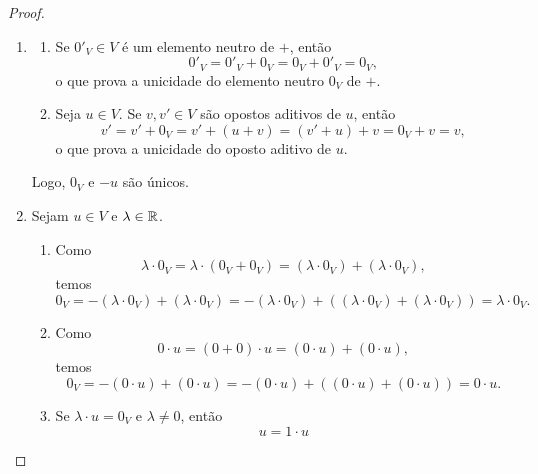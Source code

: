 \begin{proof}
    \leavevmode
        \begin{enumerate}[leftmargin=*, align=left, label=\textbf{(\alph*)}]
            \item
                \begin{enumerate}[label=\roman*.]
                    \item Se $0'_V \in V$ é um elemento neutro de $+$, então
                        \[
                            0'_V = 0'_V + 0_V = 0_V + 0'_V = 0_V,
                        \]
                    o que prova a unicidade do elemento neutro $0_V$ de $+$.
                    \item Seja $u \in V$. Se $v, v' \in V$ são opostos aditivos de $u$, então
                        \[
                            v' = v' + 0_V = v' + (u+v) = (v' + u) + v = 0_V + v = v,
                        \]
                    o que prova a unicidade do oposto aditivo de $u$.
                \end{enumerate}
            Logo, $0_V$ e $-u$ são únicos. \blackproof
            \item Sejam $u \in V$ e $\lambda \in \mathbb{R}$.
                \begin{enumerate}[label=\roman*.]
                    \item Como
                        \[
                            \lambda \cdot 0_V = \lambda \cdot (0_V+0_V)
                            = (\lambda \cdot 0_V) + (\lambda \cdot 0_V),
                        \]
                    temos
                        \[
                            0_V
                            = -(\lambda \cdot 0_V) + (\lambda \cdot 0_V)
                            = -(\lambda \cdot 0_V) + ((\lambda \cdot 0_V) + (\lambda \cdot 0_V))
                            = \lambda \cdot 0_V.
                        \]
                    \item Como
                        \[
                            0 \cdot u = (0+0) \cdot u
                            = (0 \cdot u) + (0 \cdot u),
                        \]
                    temos
                        \[
                            0_V
                            = -(0 \cdot u) + (0 \cdot u)
                            = -(0 \cdot u) + ((0 \cdot u) + (0 \cdot u))
                            = 0 \cdot u.
                        \]
                    \item Se $\lambda \cdot u = 0_V$ e $\lambda \neq 0$, então
                        \[
                            u
                            = 1 \cdot u
\]
\end{enumerate}
\end{enumerate}
\end{proof}
